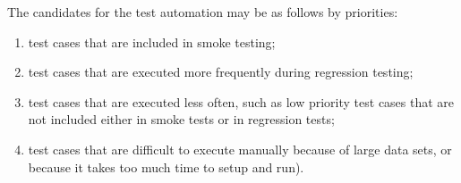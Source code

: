 The candidates for the test automation may be as follows by priorities:

 \begin{enumerate}
\item 
   test cases that are included in smoke testing;
\item 
test cases that are executed more frequently during regression testing;
\item 
test cases that are executed less often, such as low priority test cases that are not included either in smoke tests or in regression tests;
\item 
test cases that are difficult to execute manually because of large data sets, or because it takes too much time to setup and run).                                                                                                                                      \end{enumerate}
